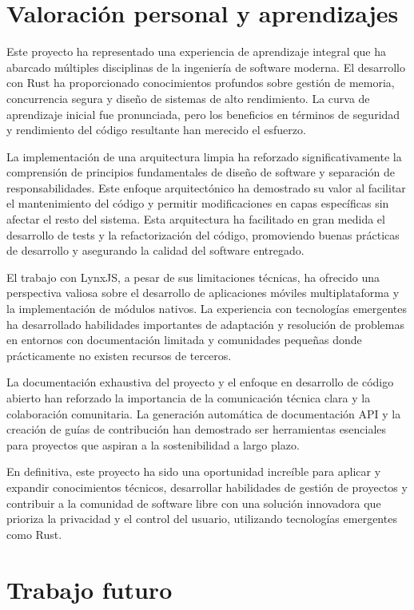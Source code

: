\section{Valoración personal y aprendizajes}

Este proyecto ha representado una experiencia de aprendizaje integral que ha abarcado múltiples disciplinas de la ingeniería de software moderna. El desarrollo con Rust ha proporcionado conocimientos profundos sobre gestión de memoria, concurrencia segura y diseño de sistemas de alto rendimiento. La curva de aprendizaje inicial fue pronunciada, pero los beneficios en términos de seguridad y rendimiento del código resultante han merecido el esfuerzo.

La implementación de una arquitectura limpia ha reforzado significativamente la comprensión de principios fundamentales de diseño de software y separación de responsabilidades. Este enfoque arquitectónico ha demostrado su valor al facilitar el mantenimiento del código y permitir modificaciones en capas específicas sin afectar el resto del sistema.
Esta arquitectura ha facilitado en gran medida el desarrollo de tests y la refactorización del código, promoviendo buenas prácticas de desarrollo y asegurando la calidad del software entregado.

El trabajo con LynxJS, a pesar de sus limitaciones técnicas, ha ofrecido una perspectiva valiosa sobre el desarrollo de aplicaciones móviles multiplataforma y la implementación de módulos nativos. La experiencia con tecnologías emergentes ha desarrollado habilidades importantes de adaptación y resolución de problemas en entornos con documentación limitada y comunidades pequeñas donde prácticamente no existen recursos de terceros.

La documentación exhaustiva del proyecto y el enfoque en desarrollo de código abierto han reforzado la importancia de la comunicación técnica clara y la colaboración comunitaria. La generación automática de documentación API y la creación de guías de contribución han demostrado ser herramientas esenciales para proyectos que aspiran a la sostenibilidad a largo plazo.

En definitiva, este proyecto ha sido una oportunidad increíble para aplicar y expandir conocimientos técnicos, desarrollar habilidades de gestión de proyectos y contribuir a la comunidad de software libre con una solución innovadora que prioriza la privacidad y el control del usuario, utilizando tecnologías emergentes como Rust.

\section{Trabajo futuro}

